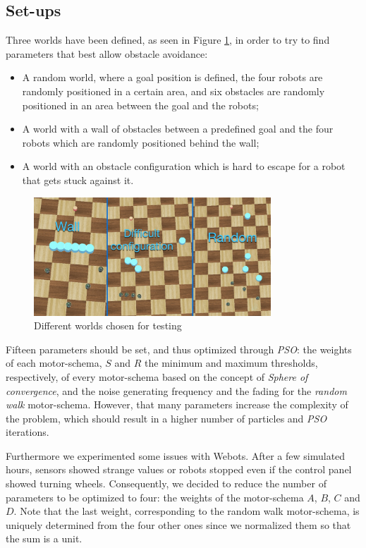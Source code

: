 \documentclass[journal]{IEEEtran}
\begin{document}
\subsection{Set-ups}
Three worlds have been defined, as seen in Figure \ref{img:worlds}, in 
order to try to find parameters that best allow obstacle avoidance:
\begin{itemize}
\item[1.] A random world, where a goal position is defined, the four robots 
are randomly positioned in a certain area, and six obstacles are randomly 
positioned in an area between the goal and the robots;
\item[2.] A world with a wall of obstacles between a predefined goal and 
the four robots which are randomly positioned behind the wall;
\item[3.] A world with an obstacle configuration which is hard to escape for a robot that gets stuck against it. 
\end{itemize}
\begin{figure}[!t]
\centering
\includegraphics[width=3.5in]{Images/world.jpg}
\caption{Different worlds chosen for testing}
\label{img:worlds}
\end{figure}
Fifteen parameters should be set, and thus optimized through \textit{PSO}: 
the weights of each motor-schema, $S$ and $R$ the minimum and maximum 
thresholds, respectively, of every motor-schema based on the concept of 
\textit{Sphere of convergence}, and the noise generating frequency and the 
fading for the \textit{random walk} motor-schema. 
However, that many parameters increase the complexity of the problem, which 
should result in a higher number of particles and \textit{PSO} iterations. 

Furthermore we experimented some issues with Webots\textregistered. After a 
few simulated hours, sensors showed strange values or robots stopped even 
if the control panel showed turning wheels. Consequently, we decided to 
reduce the number of parameters to be optimized to four: the weights of the 
motor-schema $A$, $B$, $C$ and $D$. Note that the last weight, 
corresponding to the random walk motor-schema, is uniquely determined from 
the four other ones since we normalized them so that the sum is a unit.
\end{document}
